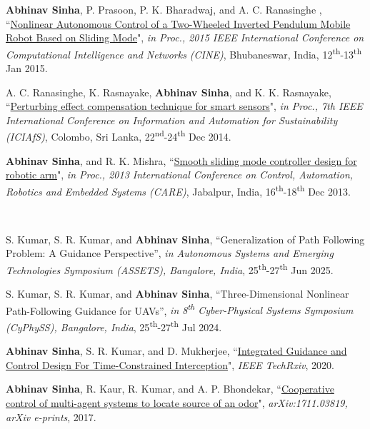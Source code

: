 {\begin{etaremune}[leftmargin=1cm]
		\item \textbf{Abhinav Sinha}, P. Prasoon, P. K. Bharadwaj, and A. C. Ranasinghe , ``\href{http://ieeexplore.ieee.org/abstract/document/7053803/}{Nonlinear Autonomous Control of a Two-Wheeled Inverted Pendulum Mobile Robot Based on Sliding Mode}", \emph{in Proc., 2015 IEEE International Conference on Computational Intelligence and Networks (CINE)}, Bhubaneswar, India, 12\textsuperscript{th}-13\textsuperscript{th} Jan 2015.
		\item A. C. Ranasinghe, K. Rasnayake, \textbf{Abhinav Sinha}, and K. K. Rasnayake, ``\href{http://ieeexplore.ieee.org/abstract/document/7069566/}{Perturbing effect compensation technique for smart sensors}", \emph{in Proc., 7th IEEE International Conference on Information and Automation for Sustainability (ICIAfS)}, Colombo, Sri Lanka, 22\textsuperscript{nd}-24\textsuperscript{th} Dec 2014.
		\item \textbf{Abhinav Sinha}, and R. K. Mishra, ``\href{http://ieeexplore.ieee.org/abstract/document/6733697/}{Smooth sliding mode controller design for robotic arm}", \emph{in Proc., 2013 International Conference on Control, Automation, Robotics and Embedded Systems (CARE)}, Jabalpur, India, 16\textsuperscript{th}-18\textsuperscript{th} Dec 2013.
\end{etaremune}}\medskip		

\\
{\renewcommand{\labelenumi}{[\textbf{A\arabic{enumi}}]}
	\begin{etaremune}[leftmargin=1cm]
		
		\item S. Kumar, S. R. Kumar, and \textbf{Abhinav Sinha}, ``{Generalization of Path Following Problem: A Guidance Perspective}'', \emph{in Autonomous Systems and Emerging Technologies Symposium (ASSETS), Bangalore, India}, 25\textsuperscript{th}-27\textsuperscript{th} Jun 2025.
		
		\item S. Kumar, S. R. Kumar, and \textbf{Abhinav Sinha}, ``{Three-Dimensional Nonlinear Path-Following Guidance for UAVs}'', \emph{in 8\textsuperscript{th} Cyber-Physical Systems Symposium (CyPhySS), Bangalore, India}, 25\textsuperscript{th}-27\textsuperscript{th} Jul 2024.
		
		\item \textbf{Abhinav Sinha}, S. R. Kumar, and D. Mukherjee, ``\href{https://doi.org/10.36227/techrxiv.12402713.v1}{Integrated Guidance and Control Design For Time-Constrained Interception}", \emph{IEEE TechRxiv}, 2020.
		
		\item \textbf{Abhinav Sinha}, R. Kaur, R. Kumar, and A. P. Bhondekar, ``\href{https://arxiv.org/abs/1711.03819}{Cooperative control of multi-agent systems to locate source of an odor}", \emph{arXiv:1711.03819, arXiv e-prints}, 2017.
\end{etaremune}}

